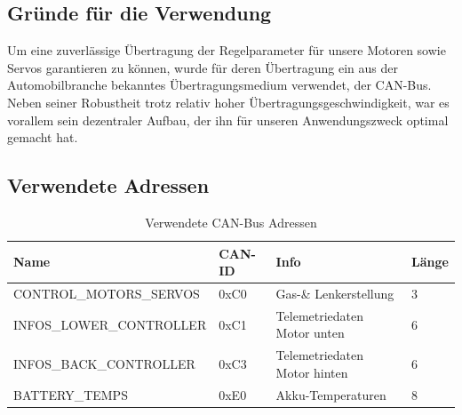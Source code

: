 \subsection{Gründe für die Verwendung}
Um eine zuverlässige Übertragung der Regelparameter für unsere Motoren sowie Servos garantieren zu können, wurde für deren Übertragung ein aus der Automobilbranche bekanntes Übertragungsmedium verwendet, der CAN-Bus. 
Neben seiner Robustheit trotz relativ hoher Übertragungsgeschwindigkeit, war es vorallem sein dezentraler Aufbau, der ihn für unseren Anwendungszweck optimal gemacht hat.

\newpage

\subsection{Verwendete Adressen}
\begin{table}[h]
    \begin{tabular}{|l|l|l|l|}
        \hline
    Name                              & CAN-ID & Info         & Länge \\\hline
    CONTROL\_MOTORS\_SERVOS  & 0xC0   & Gas-\& Lenkerstellung & 3     \\
    INFOS\_LOWER\_CONTROLLER & 0xC1   & Telemetriedaten Motor unten  & 6     \\
    INFOS\_BACK\_CONTROLLER  & 0xC3   & Telemetriedaten Motor hinten & 6     \\
    BATTERY\_TEMPS           & 0xE0   & Akku-Temperaturen            & 8    \\\hline
    \end{tabular}
    \caption{Verwendete CAN-Bus Adressen}
\end{table}
\newpage

